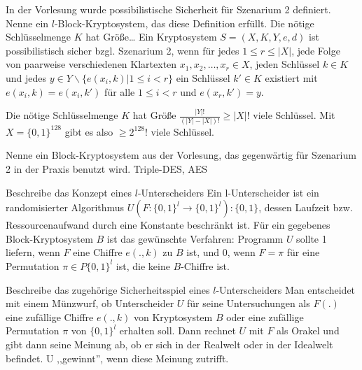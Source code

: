\documentclass[avery5371, frame]{flashcards}
\begin{document}
\begin{flashcard}{In der Vorlesung wurde possibilistische Sicherheit für Szenarium 2 definiert. Nenne ein $l$-Block-Kryptosystem, das diese Definition erfüllt. Die nötige Schlüsselmenge $K$ hat Größe\dots}
    Ein Kryptosystem $S=(X,K,Y,e,d)$ ist possibilistisch sicher bzgl. Szenarium 2, wenn für jedes $1 \leq r\leq |X|$, jede Folge von paarweise verschiedenen Klartexten $x_1,x_2,\dots,x_r\in X$, jeden Schlüssel $k\in K$ und jedes $y\in Y\backslash\{e(x_i,k)| 1 \leq i < r\}$ ein Schlüssel $k'\in K$ existiert mit $e(x_i,k)=e(x_i,k')$ für alle $1\leq i< r$ und $e(x_r,k')=y$.

    Die nötige Schlüsselmenge $K$ hat Größe $\frac{|Y|!}{(|Y|-|X|)!} \geq |X|!$ viele Schlüssel.
    Mit $X=\{0,1\}^{128}$  gibt es also $\geq 2^{128}!$ viele Schlüssel.
\end{flashcard}

\begin{flashcard}{Nenne ein Block-Kryptosystem aus der Vorlesung, das gegenwärtig für Szenarium 2 in der Praxis benutzt wird.}
    Triple-DES, AES
\end{flashcard}

\begin{flashcard}{Beschreibe das Konzept eines $l$-Unterscheiders}
    Ein l-Unterscheider ist ein randomisierter Algorithmus $U(F:\{0,1\}^l\rightarrow\{0,1\}^l):\{0,1\}$, dessen Laufzeit bzw. Ressourcenaufwand durch eine Konstante beschränkt ist.
    Für ein gegebenes Block-Kryptosystem $B$ ist das gewünschte Verfahren: Programm $U$ sollte 1 liefern, wenn $F$ eine Chiffre $e(.,k)$ zu $B$ ist, und $0$, wenn $F=\pi$ für eine Permutation $\pi\in P\{0,1\}^l$ ist, die keine $B$-Chiffre ist.
\end{flashcard}

\begin{flashcard}{Beschreibe das zugehörige Sicherheitsspiel eines $l$-Unterscheiders}
    Man entscheidet mit einem Münzwurf, ob Unterscheider $U$ für seine Untersuchungen als $F(.)$ eine zufällige Chiffre $e(.,k)$ von Kryptosystem $B$ oder eine zufällige Permutation $\pi$ von $\{0,1\}^l$ erhalten soll. Dann rechnet $U$ mit $F$ als Orakel und gibt dann seine Meinung ab, ob er sich in der Realwelt oder in der Idealwelt befindet. U ,,gewinnt'', wenn diese Meinung zutrifft.
\end{flashcard}
\end{document}
